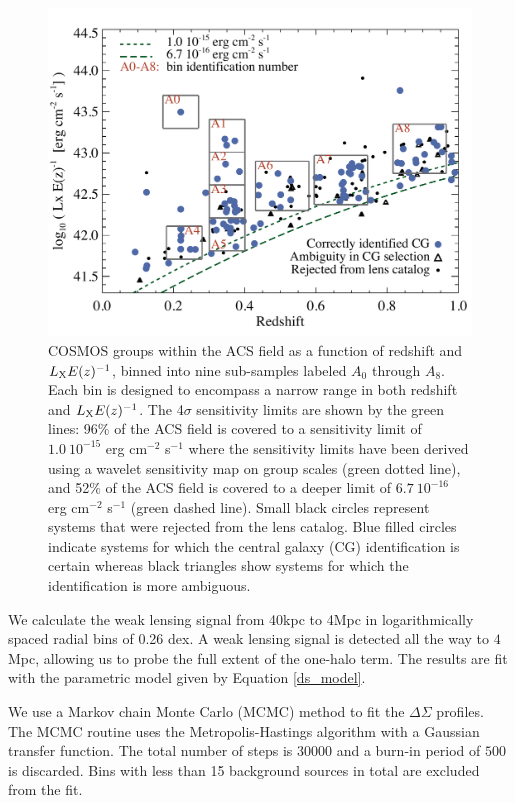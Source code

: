 \documentclass[12pt]{emulateapj}
\newcommand{\srmin}{40kpc }
\newcommand{\srmax}{4Mpc }
\begin{document}
\begin{figure}[htb]
\centerline{\includegraphics[scale=0.43]{figure3.pdf}}
\caption{COSMOS groups within the ACS field as a function of redshift
  and $L_{\rm X}E(z)^{-1}$, binned into nine sub-samples labeled
  $A_{0}$ through $A_{8}$. Each bin is designed to encompass a narrow
  range in both redshift and $L_{\rm X} E(z)^{-1}$. The 4$\sigma$
  sensitivity limits are shown by the green lines: 96$\%$ of the ACS
  field is covered to a sensitivity limit of $1.0~10^{-15}$ erg
  cm$^{-2}$ s$^{-1}$ where the sensitivity limits have been derived
  using a wavelet sensitivity map on group scales (green dotted line),
  and 52$\%$ of the ACS field is covered to a deeper limit of
  $6.7~10^{-16}$ erg cm$^{-2}$ s$^{-1}$ (green dashed line). Small
  black circles represent systems that were rejected from the lens
  catalog. Blue filled circles indicate systems for which the central
  galaxy (CG) identification is certain whereas black triangles show
  systems for which the identification is more ambiguous.}
\label{bining_scheme}
\end{figure}

We calculate the weak lensing signal from \srmin to \srmax in
logarithmically spaced radial bins of 0.26 dex. A weak lensing signal
is detected all the way to $4$Mpc, allowing us to probe the full
extent of the one-halo term. The results are fit with the parametric
model given by Equation \ref{ds_model}.

We use a Markov chain Monte Carlo (MCMC) method to fit the
$\Delta\Sigma$ profiles. The MCMC routine uses the Metropolis-Hastings
algorithm with a Gaussian transfer function. The total number of steps
is $30000$ and a burn-in period of $500$ is discarded. Bins with less
than 15 background sources in total are excluded from the fit.
\end{document}
